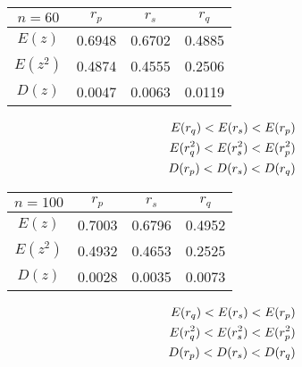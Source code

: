 \documentclass[12pt]{article}
\begin{document}
\begin{multicols}{2}
    \begin{tabular}{ | c | c | c | c |}
    \hline
    $n = 60$           & $r_{p}$  & $r_s$  & $r_q$ \\ \hline
    $E(z)$               & 0.6948 & 0.6702 & 0.4885 \\ \hline
    $E(z^2)$             & 0.4874 & 0.4555 & 0.2506 \\ \hline
    $D(z)$               & 0.0047 & 0.0063 & 0.0119 \\ \hline
    \end{tabular}
    \columnbreak
    \begin{equation}
        \begin{aligned}
        \notag
            E(r_q) < E(r_s) < E(r_p) \\
            E(r^2_q) < E(r^2_s) < E(r^2_p) \\
            D(r_p) < D(r_s) < D(r_q)
        \end{aligned}
    \end{equation}
\end{multicols}

\begin{multicols}{2}
    \begin{tabular}{ | c | c | c | c |}
    \hline
    $n = 100$          & $r_{p}$  & $r_s$  & $r_q$ \\ \hline
    $E(z)$               & 0.7003 & 0.6796 & 0.4952 \\ \hline
    $E(z^2)$             & 0.4932 & 0.4653 & 0.2525 \\ \hline
    $D(z)$               & 0.0028 & 0.0035 & 0.0073 \\ \hline
    \end{tabular}
    \columnbreak
    \begin{equation}
        \begin{aligned}
        \notag
            E(r_q) < E(r_s) < E(r_p) \\
            E(r^2_q) < E(r^2_s) < E(r^2_p) \\
            D(r_p) < D(r_s) < D(r_q)
        \end{aligned}
    \end{equation}
\end{multicols}

\vspace{1cm}
\end{document}
